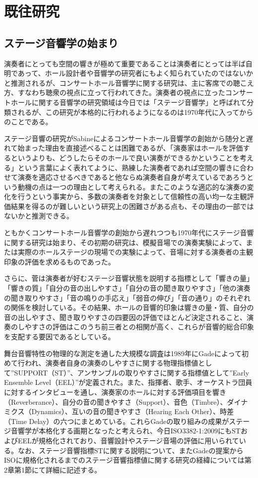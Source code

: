 \documentclass[11pt,a4j]{jreport}
\begin{document}
\section{既往研究}

\subsection*{ステージ音響学の始まり}
演奏者にとっても空間の響きが極めて重要であることは演奏者にとっては半ば自明であって、ホール設計者や音響学の研究者にもよく知られていたのではないかと推測されるが、コンサートホール音響学に関する研究は、主に客席での聴こえ方、すなわち聴衆の視点に立って行われてきた。演奏者の視点に立ったコンサートホールに関する音響学の研究領域は今日では「ステージ音響学」と呼ばれて分類されるが、この研究が本格的に行われるようになるのは1970年代に入ってからのことである。

ステージ音響の研究がSabineによるコンサートホール音響学の創始から随分と遅れて始まった理由を直接述べることは困難であるが、「演奏家はホールを評価するというよりも、どうしたらそのホールで良い演奏ができるかということを考える」という言葉\cite{橘1997}によく表れてように、熟練した演奏者であれば空間の響きに合わせて演奏を適応させるべきであると他ならぬ演奏者自身が考えているであろうという動機の点は一つの理由として考えられる。またこのような適応的な演奏の変化を行うという事実から、多数の演奏者を対象として信頼性の高い均一な主観評価結果を得るのが難しいという研究上の困難さがある点も、その理由の一部ではないかと推測できる。
  
ともかくコンサートホール音響学の創始から遅れつつも1970年代にステージ音響に関する研究は始まり、その初期の研究は、模擬音場での演奏実験によって\cite{marhsall1978, nakayama1984, naylor1988}、または実際のホールステージの現場での実験によって\cite{Gade1989II, chiang2003, jeon2005}、音場に対する演奏者の主観印象の評価を求めるものであった。

さらに、菅\cite{suga1986}は演奏者が好むステージ音響状態を説明する指標として「響きの量」「響きの質」「自分の音の出しやすさ」「自分の音の聞き取りやすさ」「他の演奏の聞き取りやすさ」「音の鳴りの手応え」「弱音の伸び」「音の通り」のそれぞれの関係を検討している。その結果、ホールの音響的印象は響きの量・質、自分の音の出しやすさ、聞き取りやすさの四要因の評価でほとんど決定されること、演奏のしやすさの評価はこのうち前三者との相関が高く、これらが音響的総合印象を支配する要因であるとしている。

舞台音響特性の物理的な測定を通した大規模な調査は1989年にGade\cite{Gade1989II}によって初めて行われ、演奏者自身の演奏のしやすさに関する物理指標値として”SUPPORT（ST）”、アンサンブルの取りやすさに関する指標値として”Early Ensemble Level（EEL）”が定義された。また、指揮者、歌手、オーケストラ団員に対するインタビューを通し、演奏家のホールに対する評価項目を響き（Reverberance）、自分の音の聞きやすさ（Support）、音色（Timbre）、ダイナミクス（Dynamics）、互いの音の聞きやすさ（Hearing Each Other）、時差（Time Delay）の六つにまとめている。これらGadeの取り組みの成果がステージ音響学が本格化する画期となったと考えられ、今日ISO3382-1:2009にもSTおよびEELが規格化されており、音響設計やステージ音場の評価に用いられている。なお、ステージ音響指標STに関する説明について、またGadeの提案からISOに規格化されるまでのステージ音響指標値に関する研究の経緯については第2章第1節にて詳細に記述する。
\end{document}
